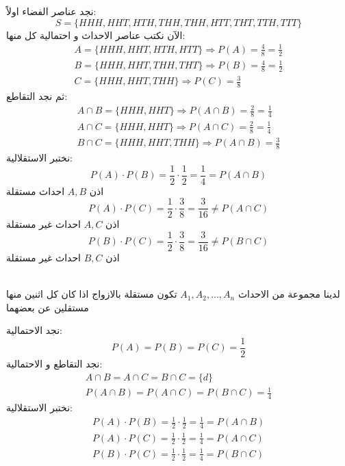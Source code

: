 \begin{solution}
	نجد عناصر الفضاء اولاً:
	\[
	S = \{HHH, HHT, HTH, THH, THH, HTT, THT, TTH, TTT\}
	\]
	الآن نكتب عناصر الاحداث و احتمالية كل منها:
	\begin{gather*}
		A = \{HHH, HHT, HTH, HTT\} \Rightarrow P(A) = \frac{4}{8} = \frac{1}{2}\\
		B = \{HHH, HHT, THH, THT\} \Rightarrow P(B) = \frac{4}{8} = \frac{1}{2}\\
		C = \{HHH, HHT, THH\} \Rightarrow P(C) = \frac{3}{8}
	\end{gather*}
	ثم نجد التقاطع:
	\begin{gather*}
		A \cap B = \{HHH, HHT\} \Rightarrow P(A\cap B) = \frac{2}{8} = \frac{1}{4} \\
		A \cap C = \{HHH, HHT\} \Rightarrow P(A\cap C) = \frac{2}{8} = \frac{1}{4} \\
		B \cap C = \{HHH, HHT, THH\} \Rightarrow P(A\cap B) = \frac{3}{8} 
	\end{gather*}
	نختبر الاستقلالية:
	\[
	P(A)\cdot P(B) = \frac{1}{2}\cdot\frac{1}{2} = \frac{1}{4} = P(A\cap B)
	\]
	اذن \(A, B\) احداث مستقلة 
	\[
	P(A)\cdot P(C) = \frac{1}{2}\cdot\frac{3}{8} = \frac{3}{16} \neq P(A\cap C)
	\]
	اذن \(A, C\) احداث غير مستقلة 
	\[
	P(B)\cdot P(C) = \frac{1}{2}\cdot\frac{3}{8} = \frac{3}{16} \neq P(B\cap C)
	\]
	اذن \(B, C\) احداث غير مستقلة 
\end{solution}

\begin{definition}
	\\
	لدينا مجموعة من الاحداث \(A_1, A_2, \dots, A_n\) تكون مستقلة بالازواج اذا كان كل اثنين منها مستقلين عن بعضهما 
\end{definition}

\begin{example}
\end{example}

\begin{solution}
	نجد الاحتمالية:
	\[
	P(A) = P(B) = P(C) = \frac{1}{2} 
	\]
	نجد التقاطع و الاحتمالية:
	\begin{gather*}
	A\cap B = A\cap C = B\cap C = \{d\}\\
	P(A\cap B) = P(A\cap C) = P(B\cap C) = \frac{1}{4}
	\end{gather*}
	نختبر الاستقلالية:
	\begin{gather*}
		P(A)\cdot P(B) = \frac{1}{2}\cdot\frac{1}{2} = \frac{1}{4} = P(A\cap B)\\
		P(A)\cdot P(C) = \frac{1}{2}\cdot\frac{1}{2} = \frac{1}{4} = P(A\cap C)\\
		P(B)\cdot P(C) = \frac{1}{2}\cdot\frac{1}{2} = \frac{1}{4} = P(B\cap C)
	\end{gather*}
\end{solution}

